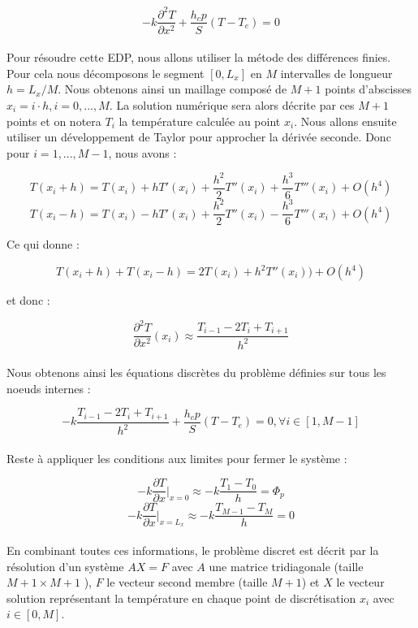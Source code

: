 \documentclass[12pt,a4paper]{article}
\begin{document}
	$$-k \frac{\partial^2 T}{\partial x^2} + \frac{h_c p}{S} (T - T_e) = 0$$\\

	Pour résoudre cette EDP, nous allons utiliser la métode des différences finies.
	Pour cela nous décomposons le segment $[0,L_x]$ en $M$ intervalles de longueur $h = L_x/M$.
	Nous obtenons ainsi un maillage composé de $M+1$ points d'abscisses $x_i = i\cdot h, i = 0,...,M$.
	La solution numérique sera alors décrite par ces $M+1$ points et on notera $T_i$ la température calculée au point $x_i$.
	Nous allons ensuite utiliser un développement de Taylor pour approcher la dérivée seconde. Donc pour $i = 1,...,M-1$, nous avons :

	$$T(x_i+h) = T(x_i) + hT'(x_i) + \frac{h^2}{2}T''(x_i) + \frac{h^3}{6}T'''(x_i) + O(h^4)$$
	$$T(x_i-h) = T(x_i) - hT'(x_i) + \frac{h^2}{2}T''(x_i) - \frac{h^3}{6}T'''(x_i) + O(h^4)$$

	Ce qui donne :

	$$T(x_i+h) + T(x_i-h) = 2T(x_i) + h^2T''(x_i)) + O(h^4)$$

	et donc :

	$$ \frac{\partial^2 T}{\partial x^2}(x_i) \approx \frac{T_{i-1} - 2T_i + T_{i+1}}{h^2}$$\\

	Nous obtenons ainsi les équations discrètes du problème définies sur tous les noeuds internes :

	$$ -k\frac{T_{i-1} - 2T_i + T_{i+1}}{h^2} + \frac{h_c p}{S} (T - T_e) = 0, \forall i \in [1,M-1]$$\\

	Reste à appliquer les conditions aux limites pour fermer le système :

	$$-k \frac{\partial T}{\partial x} \bigg|_{x=0} \approx -k\frac{T_1 - T_0}{h} = \Phi_p$$
	$$-k \frac{\partial T}{\partial x} \bigg|_{x=L_x} \approx -k\frac{T_{M-1} - T_M}{h} = 0$$\\

	En combinant toutes ces informations, le problème discret est décrit par la résolution d'un système
	$AX=F$ avec $A$ une matrice tridiagonale (taille $M + 1 \times M + 1$ ), $F$ le vecteur second membre
	(taille $M + 1$) et $X$ le vecteur solution représentant la température en chaque point de discrétisation
	$x_i$ avec $i \in [0,M]$.
\end{document}
